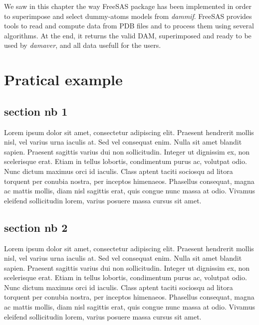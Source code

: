 \documentclass[a4paper, 11pt]{report}
\begin{document}
We saw in this chapter the way FreeSAS package has been implemented in 
order to superimpose and select dummy-atoms models from 
\textit{dammif}. 
FreeSAS provides tools to read and compute data from PDB files and to 
process them using several algorithms. 
At the end, it returns the valid DAM, superimposed and ready to be 
used by \textit{damaver}, and all data usefull for the users.


\chapter{Pratical example}%

\section{section nb 1}

Lorem ipsum dolor sit amet, consectetur adipiscing elit.
Praesent hendrerit mollis nisl, vel varius urna iaculis at.
Sed vel consequat enim.
Nulla sit amet blandit sapien.
Praesent sagittis varius dui non sollicitudin.
Integer ut dignissim ex, non scelerisque erat.
Etiam in tellus lobortis, condimentum purus ac, volutpat odio.
Nunc dictum maximus orci id iaculis.
Class aptent taciti sociosqu ad litora torquent per conubia nostra, 
per inceptos himenaeos.
Phasellus consequat, magna ac mattis mollis, diam nisl sagittis erat, 
quis congue nunc massa at odio.
Vivamus eleifend sollicitudin lorem, varius posuere massa cursus sit 
amet.

\section{section nb 2}

Lorem ipsum dolor sit amet, consectetur adipiscing elit.
Praesent hendrerit mollis nisl, vel varius urna iaculis at.
Sed vel consequat enim.
Nulla sit amet blandit sapien.
Praesent sagittis varius dui non sollicitudin.
Integer ut dignissim ex, non scelerisque erat.
Etiam in tellus lobortis, condimentum purus ac, volutpat odio.
Nunc dictum maximus orci id iaculis.
Class aptent taciti sociosqu ad litora torquent per conubia nostra, 
per inceptos himenaeos.
Phasellus consequat, magna ac mattis mollis, diam nisl sagittis erat, 
quis congue nunc massa at odio.
Vivamus eleifend sollicitudin lorem, varius posuere massa cursus sit 
amet.
\end{document}

